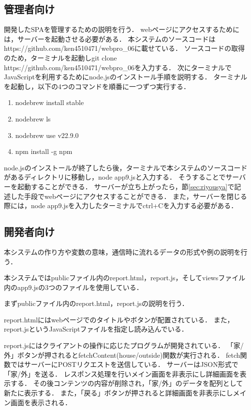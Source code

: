 \documentclass[uplatex,dvipdfmx]{jsarticle}
\begin{document}
\subsection{管理者向け}
開発したSPAを管理するための説明を行う．
webページにアクセスするためには，サーバーを起動させる必要がある．
本システムのソースコードはhttps://github.com/ken4510471/webpro\_06に載せている．
ソースコードの取得のため，ターミナルを起動しgit clone https://github.com/ken4510471/webpro\_06を入力する．
次にターミナルでJavaScriptを利用するためにnode.jsのインストール手順を説明する．
ターミナルを起動し，以下の4つのコマンドを順番に一つずつ実行する．
\begin{enumerate}
    \item nodebrew install stable
    \item nodebrew ls
    \item nodebrew use v22.9.0
    \item npm install -g npm
\end{enumerate}
node.jsのインストールが終了したら後，ターミナルで本システムのソースコードがあるディレクトリに移動し，node app9.jsと入力する．
そうすることでサーバーを起動することができる．
サーバーが立ち上がったら，節\ref{sec:riyousya}で記述した手段でwebページにアクセスすることができる．
また，サーバーを閉じる際には，node app9.jsを入力したターミナルでctrl+Cを入力する必要がある．
\subsection{開発者向け}\label{sec:kaihatusya}
本システムの作り方や変数の意味，通信時に流れるデータの形式や例の説明を行う．

本システムではpublicファイル内のreport.html，report.js，そしてviewsファイル内のapp9.jsの3つのファイルを使用している．

まずpublicファイル内のreport.html，report.jsの説明を行う．

report.htmlにはwebページでのタイトルやボタンが配置されている．
また，report.jsというJavaScriptファイルを指定し読み込んでいる．

report.jsにはクライアントの操作に応じたプログラムが開発されている．
「家/外」ボタンが押されるとfetchContent(house/outside)関数が実行される．
fetch関数ではサーバーにPOSTリクエストを送信している．
サーバーはJSON形式で「家/外」を送る．
レスポンス処理を行いメイン画面を非表示にし詳細画面を表示する．
その後コンテンツの内容が削除され，「家/外」のデータを配列として新たに表示する．
また，「戻る」ボタンが押されると詳細画面を非表示にしメイン画面を表示される．
\end{document}
